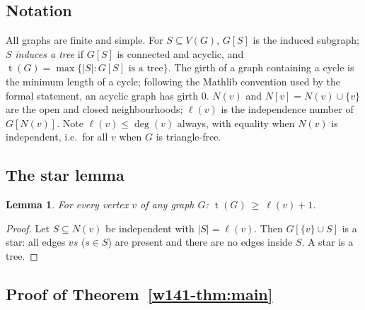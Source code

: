 \documentclass[11pt]{article}
\numberwithin{equation}{section}
\newtheorem{lemma}[theorem]{Lemma}
\theoremstyle{remark}
\newcommand{\tr}{\operatorname{t}}
\newcommand{\lv}{\ell}
\begin{document}
\subsection{Notation}

All graphs are finite and simple.  For $S\subseteq V(G)$, $G[S]$ is the
induced subgraph; $S$ \emph{induces a tree} if $G[S]$ is connected and
acyclic, and $\tr(G)=\max\{|S|:G[S]\text{ is a tree}\}$.  The girth of a
graph containing a cycle is the minimum length of a cycle; following the
Mathlib convention used by the formal statement, an acyclic graph has girth
$0$.  $N(v)$ and $N[v]=N(v)\cup\{v\}$ are the open and closed
neighbourhoods; $\lv(v)$ is the independence number of $G[N(v)]$.  Note
$\lv(v)\le\deg(v)$ always, with equality when $N(v)$ is independent, i.e.\
for all $v$ when $G$ is triangle-free.

\subsection{The star lemma}

\begin{lemma}\label{w141-lem:star}
For every vertex $v$ of any graph $G$: $\tr(G)\ \ge\ \lv(v)+1$.
\end{lemma}

\begin{proof}
Let $S\subseteq N(v)$ be independent with $|S|=\lv(v)$.  Then
$G[\{v\}\cup S]$ is a star: all edges $vs$ ($s\in S$) are present and there
are no edges inside $S$.  A star is a tree.
\end{proof}

\subsection{Proof of Theorem~\texorpdfstring{\ref{w141-thm:main}}{1.1}}
\end{document}
